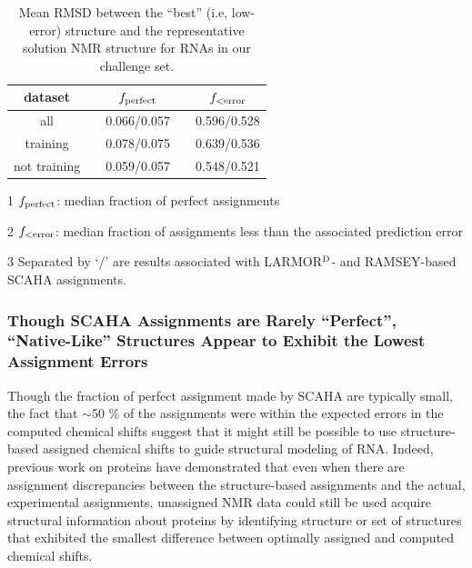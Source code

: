 \documentclass[journal=jcisd8,manuscript=article,layout=onecolumn]{achemso}
\begin{document}
\begin{table}[h!]
\centering
\caption{Mean RMSD between the ``best'' (i.e, low-error) structure and the representative solution NMR structure for RNAs in our challenge set.}
\begin{threeparttable}
\begin{tabular}{*5c}
\hline
dataset & {} & $f_{\rm perfect}$ & {} & $f_{\rm < error}$ \\
\hline
all & {}           & 0.066/0.057 & {} & 0.596/0.528 \\
training & {}      & 0.078/0.075 & {} & 0.639/0.536 \\
not training & {}  & 0.059/0.057 & {} & 0.548/0.521 \\
\hline
\end{tabular}
\begin{tablenotes}
\item[1]  $f_{\rm perfect}$: median fraction of perfect assignments
\item[2] $f_{\rm < error}$: median fraction of assignments less than the associated prediction error
\item[3] Separated by `/' are  results associated with LARMOR$^{\rm D}$- and RAMSEY-based SCAHA assignments.
\end{tablenotes}
\end{threeparttable}
\label{tab:fractions} 
\end{table}

\subsubsection{Though SCAHA Assignments are Rarely ``Perfect'',  ``Native-Like'' Structures Appear to Exhibit the Lowest Assignment Errors} 


Though the fraction of perfect assignment made by SCAHA are typically small, the fact that $\sim$50 \% of the assignments were within the expected errors  in the computed chemical shifts suggest that it  might still be possible to use structure-based assigned chemical shifts to guide structural modeling of RNA. Indeed, previous work on proteins have demonstrated that even when there are assignment discrepancies between the structure-based assignments and the actual, experimental assignments\cite{meiler2003rapid, bermejo2008deuterated, courtney2015experimental}, unassigned NMR data could still be used acquire structural information about proteins by identifying structure or set of structures that exhibited the smallest difference between optimally assigned and computed chemical shifts. 
\end{document}
